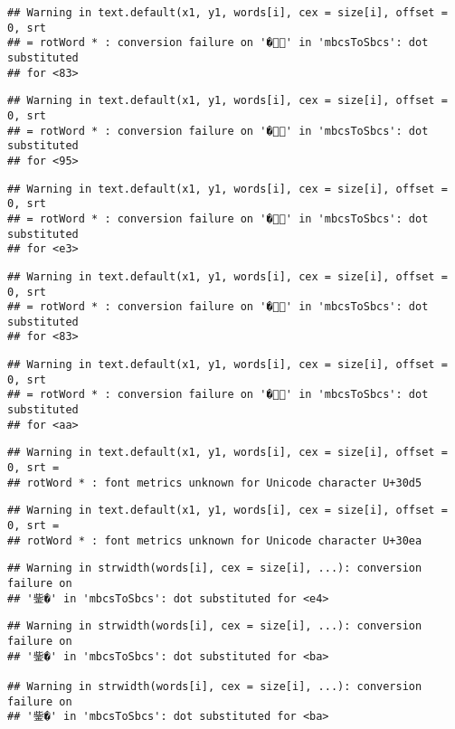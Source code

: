 \documentclass[]{article}
\begin{document}
\begin{verbatim}
## Warning in text.default(x1, y1, words[i], cex = size[i], offset = 0, srt
## = rotWord * : conversion failure on '�' in 'mbcsToSbcs': dot substituted
## for <83>
\end{verbatim}

\begin{verbatim}
## Warning in text.default(x1, y1, words[i], cex = size[i], offset = 0, srt
## = rotWord * : conversion failure on '�' in 'mbcsToSbcs': dot substituted
## for <95>
\end{verbatim}

\begin{verbatim}
## Warning in text.default(x1, y1, words[i], cex = size[i], offset = 0, srt
## = rotWord * : conversion failure on '�' in 'mbcsToSbcs': dot substituted
## for <e3>
\end{verbatim}

\begin{verbatim}
## Warning in text.default(x1, y1, words[i], cex = size[i], offset = 0, srt
## = rotWord * : conversion failure on '�' in 'mbcsToSbcs': dot substituted
## for <83>
\end{verbatim}

\begin{verbatim}
## Warning in text.default(x1, y1, words[i], cex = size[i], offset = 0, srt
## = rotWord * : conversion failure on '�' in 'mbcsToSbcs': dot substituted
## for <aa>
\end{verbatim}

\begin{verbatim}
## Warning in text.default(x1, y1, words[i], cex = size[i], offset = 0, srt =
## rotWord * : font metrics unknown for Unicode character U+30d5
\end{verbatim}

\begin{verbatim}
## Warning in text.default(x1, y1, words[i], cex = size[i], offset = 0, srt =
## rotWord * : font metrics unknown for Unicode character U+30ea
\end{verbatim}

\begin{verbatim}
## Warning in strwidth(words[i], cex = size[i], ...): conversion failure on
## '鈭�' in 'mbcsToSbcs': dot substituted for <e4>
\end{verbatim}

\begin{verbatim}
## Warning in strwidth(words[i], cex = size[i], ...): conversion failure on
## '鈭�' in 'mbcsToSbcs': dot substituted for <ba>

## Warning in strwidth(words[i], cex = size[i], ...): conversion failure on
## '鈭�' in 'mbcsToSbcs': dot substituted for <ba>
\end{verbatim}
\end{document}
